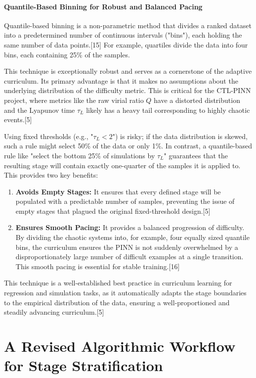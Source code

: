 \documentclass[11pt, letterpaper]{article}
\begin{document}
\subsection{Quantile-Based Binning for Robust and Balanced Pacing}

Quantile-based binning is a non-parametric method that divides a ranked dataset into a predetermined number of continuous intervals ("bins"), each holding the same number of data points.[15] For example, quartiles divide the data into four bins, each containing 25\% of the samples.

This technique is exceptionally robust and serves as a cornerstone of the adaptive curriculum. Its primary advantage is that it makes no assumptions about the underlying distribution of the difficulty metric. This is critical for the CTL-PINN project, where metrics like the raw virial ratio $Q$ have a distorted distribution and the Lyapunov time $\tau_L$ likely has a heavy tail corresponding to highly chaotic events.[5]

Using fixed thresholds (e.g., "$\tau_L < 2$") is risky; if the data distribution is skewed, such a rule might select 50\% of the data or only 1\%. In contrast, a quantile-based rule like "select the bottom 25\% of simulations by $\tau_L$" guarantees that the resulting stage will contain exactly one-quarter of the samples it is applied to. This provides two key benefits:
\begin{enumerate}
    \item \textbf{Avoids Empty Stages:} It ensures that every defined stage will be populated with a predictable number of samples, preventing the issue of empty stages that plagued the original fixed-threshold design.[5]
    \item \textbf{Ensures Smooth Pacing:} It provides a balanced progression of difficulty. By dividing the chaotic systems into, for example, four equally sized quantile bins, the curriculum ensures the PINN is not suddenly overwhelmed by a disproportionately large number of difficult examples at a single transition. This smooth pacing is essential for stable training.[16]
\end{enumerate}
This technique is a well-established best practice in curriculum learning for regression and simulation tasks, as it automatically adapts the stage boundaries to the empirical distribution of the data, ensuring a well-proportioned and steadily advancing curriculum.[5]

\part{A Revised Algorithmic Workflow for Stage Stratification}
\end{document}
